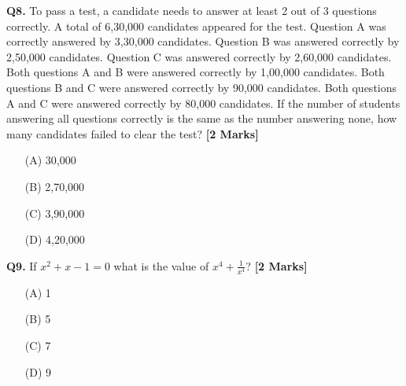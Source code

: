 \documentclass[11pt]{article}
\newcommand{\questionb}[2]{
    \noindent\textbf{Q#2.} #1 \hfill \textbf{[2 Marks]}
}
\begin{document}
\questionb{To pass a test, a candidate needs to answer at least 2 out of 3 questions correctly. A total of 6,30,000 candidates appeared for the test. Question A was correctly answered by 3,30,000 candidates. Question B was answered correctly by 2,50,000 candidates. Question C was answered correctly by 2,60,000 candidates. Both questions A and B were answered correctly by 1,00,000 candidates. Both questions B and C were answered correctly by 90,000 candidates. Both questions A and C were answered correctly by 80,000 candidates. If the number of students answering all questions correctly is the same as the number answering none, how many candidates failed to clear the test?}{8}
\begin{enumerate}
    \item[(A)] 30,000  
    \item[(B)] 2,70,000  
    \item[(C)] 3,90,000  
    \item[(D)] 4,20,000  
\end{enumerate}
\vspace{0.5cm}

\questionb{If \(x^2 + x - 1 = 0\) what is the value of \(x^4 + \frac{1}{x^4}\)?}{9}
\begin{enumerate}
    \item[(A)] 1  
    \item[(B)] 5  
    \item[(C)] 7  
    \item[(D)] 9  
\end{enumerate}
\vspace{0.5cm}
\end{document}
